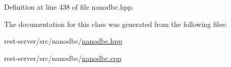 Definition at line 438 of file nanodbc.\+hpp.



The documentation for this class was generated from the following files\+:\begin{DoxyCompactItemize}
\item 
rest-\/server/src/nanodbc/\mbox{\hyperlink{nanodbc_8hpp}{nanodbc.\+hpp}}\item 
rest-\/server/src/nanodbc/\mbox{\hyperlink{nanodbc_8cpp}{nanodbc.\+cpp}}\end{DoxyCompactItemize}
